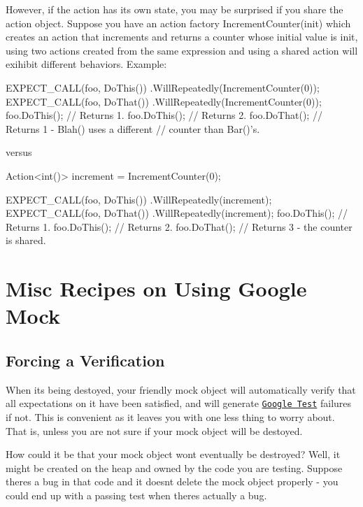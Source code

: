 However, if the action has its own state, you may be surprised if you share the action object. Suppose you have an action factory {\ttfamily Increment\+Counter(init)} which creates an action that increments and returns a counter whose initial value is {\ttfamily init}, using two actions created from the same expression and using a shared action will exihibit different behaviors. Example\+:


\begin{DoxyCode}
EXPECT\_CALL(foo, DoThis())
    .WillRepeatedly(IncrementCounter(0));
EXPECT\_CALL(foo, DoThat())
    .WillRepeatedly(IncrementCounter(0));
foo.DoThis();  // Returns 1.
foo.DoThis();  // Returns 2.
foo.DoThat();  // Returns 1 - Blah() uses a different
               // counter than Bar()'s.
\end{DoxyCode}


versus


\begin{DoxyCode}
Action<int()> increment = IncrementCounter(0);

EXPECT\_CALL(foo, DoThis())
    .WillRepeatedly(increment);
EXPECT\_CALL(foo, DoThat())
    .WillRepeatedly(increment);
foo.DoThis();  // Returns 1.
foo.DoThis();  // Returns 2.
foo.DoThat();  // Returns 3 - the counter is shared.
\end{DoxyCode}


\section*{Misc Recipes on Using Google Mock}

\subsection*{Forcing a Verification}

When it\textquotesingle{}s being destoyed, your friendly mock object will automatically verify that all expectations on it have been satisfied, and will generate \href{http://code.google.com/p/googletest/}{\tt Google Test} failures if not. This is convenient as it leaves you with one less thing to worry about. That is, unless you are not sure if your mock object will be destoyed.

How could it be that your mock object won\textquotesingle{}t eventually be destroyed? Well, it might be created on the heap and owned by the code you are testing. Suppose there\textquotesingle{}s a bug in that code and it doesn\textquotesingle{}t delete the mock object properly -\/ you could end up with a passing test when there\textquotesingle{}s actually a bug.

